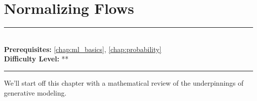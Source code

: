 \documentclass[book.tex]{subfiles}
\begin{document}
\chapter{Normalizing Flows}
\label{chap:normalizing_flows}
\noindent\rule{11cm}{0.4pt} \\
\textbf{Prerequisites:}  \autoref{chap:ml_basics}, \autoref{chap:probability}  \\
\textbf{Difficulty Level:} ** \\
\noindent\rule{11cm}{0.4pt}
\vspace{5mm}





We'll start off this chapter with a mathematical review of the underpinnings of generative modeling. %
\end{document}
